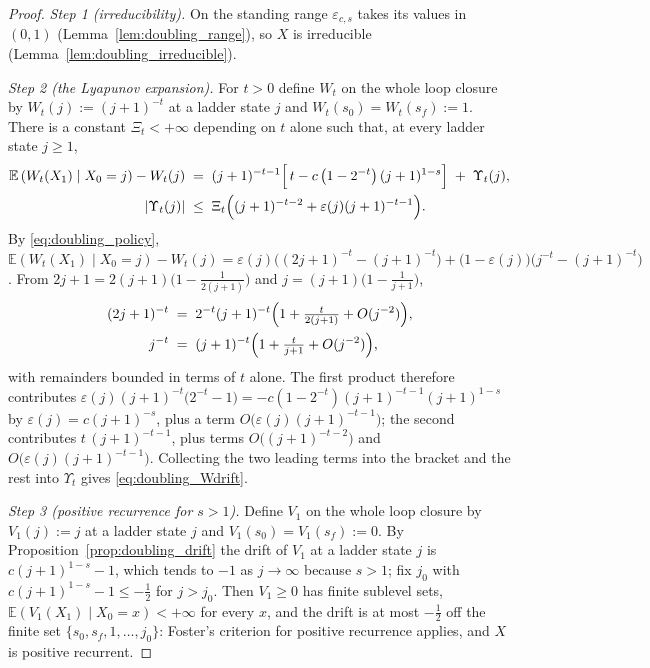 \begin{proof}
\emph{Step 1 (irreducibility).} On the standing range $\varepsilon_{c,s}$ takes its values in
$(0,1)$ (Lemma~\ref{lem:doubling_range}), so $X$ is irreducible
(Lemma~\ref{lem:doubling_irreducible}).

\emph{Step 2 (the Lyapunov expansion).} For $t>0$ define $W_t$ on the whole loop closure by
$W_t(j):=(j+1)^{-t}$ at a ladder state $j$ and $W_t(s_0)=W_t(s_f):=1$. There is a constant
$\Xi_t<+\infty$ depending on $t$ alone such that, at every ladder state $j\geq1$,
\begin{equation}\label{eq:doubling_Wdrift}
\begin{aligned}
    \mathbb E\left(W_t(X_1)\mid X_0=j\right)-W_t(j)
    &\;=\;(j+1)^{-t-1}\Bigl[\,t-c\left(1-2^{-t}\right)(j+1)^{1-s}\Bigr]\;+\;\Upsilon_t(j),\\
    |\Upsilon_t(j)|&\;\leq\;\Xi_t\Bigl((j+1)^{-t-2}+\varepsilon(j)(j+1)^{-t-1}\Bigr).
\end{aligned}
\end{equation}
By \eqref{eq:doubling_policy},
$\mathbb E(W_t(X_1)\mid X_0=j)-W_t(j)=\varepsilon(j)\bigl((2j+1)^{-t}-(j+1)^{-t}\bigr)+\bigl(1-\varepsilon(j)\bigr)\bigl(j^{-t}-(j+1)^{-t}\bigr)$.
From $2j+1=2(j+1)\bigl(1-\tfrac1{2(j+1)}\bigr)$ and $j=(j+1)\bigl(1-\tfrac1{j+1}\bigr)$,
\begin{equation*}
\begin{aligned}
    (2j+1)^{-t}&\;=\;2^{-t}(j+1)^{-t}\Bigl(1+\tfrac t{2(j+1)}+O(j^{-2})\Bigr),\\
    j^{-t}&\;=\;(j+1)^{-t}\Bigl(1+\tfrac t{j+1}+O(j^{-2})\Bigr),
\end{aligned}
\end{equation*}
with remainders bounded in terms of $t$ alone. The first product therefore contributes
$\varepsilon(j)(j+1)^{-t}\bigl(2^{-t}-1\bigr)=-c\left(1-2^{-t}\right)(j+1)^{-t-1}(j+1)^{1-s}$
by $\varepsilon(j)=c(j+1)^{-s}$, plus a term $O\bigl(\varepsilon(j)(j+1)^{-t-1}\bigr)$; the
second contributes $t\,(j+1)^{-t-1}$, plus terms $O\bigl((j+1)^{-t-2}\bigr)$ and
$O\bigl(\varepsilon(j)(j+1)^{-t-1}\bigr)$. Collecting the two leading terms into the bracket
and the rest into $\Upsilon_t$ gives \eqref{eq:doubling_Wdrift}.

\emph{Step 3 (positive recurrence for $s>1$).} Define $V_1$ on the whole loop closure by
$V_1(j):=j$ at a ladder state $j$ and $V_1(s_0)=V_1(s_f):=0$. By
Proposition~\ref{prop:doubling_drift} the drift of $V_1$ at a ladder state $j$ is
$c(j+1)^{1-s}-1$, which tends to $-1$ as $j\rightarrow\infty$ because $s>1$; fix $j_0$ with
$c(j+1)^{1-s}-1\leq-\tfrac12$ for $j>j_0$. Then $V_1\geq0$ has finite sublevel sets,
$\mathbb E(V_1(X_1)\mid X_0=x)<+\infty$ for every $x$, and the drift is at most $-\tfrac12$ off the
finite set $\{s_0,s_f,1,\dots,j_0\}$: Foster's criterion for positive recurrence applies, and
$X$ is positive recurrent.


\end{proof}
